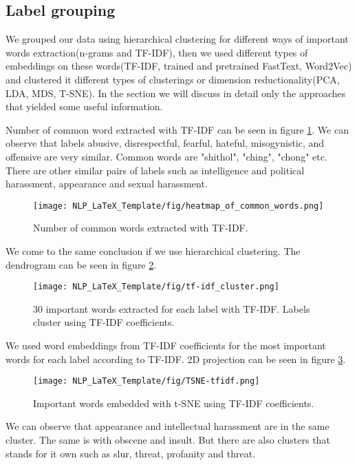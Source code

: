 \documentclass[fleqn,moreauthors,10pt]{ds_report}
\begin{document}
\subsection*{Label grouping}
We grouped our data using hierarchical clustering for different ways of important words extraction(n-grams and TF-IDF), then we used different types of embeddings on these words(TF-IDF, trained and pretrained FastText, Word2Vec) and clustered it different types of clusterings or dimension reductionality(PCA, LDA, MDS, T-SNE). In the section we will discuss in detail only the approaches that yielded some useful information.  

Number of common word extracted with TF-IDF can be seen in figure \ref{fig:common_tfidf}. We can observe that labels abusive, disrespectful, fearful, hateful, misogynistic, and offensive are very similar. Common words are "shithol", "ching", "chong" etc. There are other similar pairs of labels such as intelligence and political harassment, appearance and sexual harassment.
\begin{figure}
    \centering
    \texttt{[image: NLP\_LaTeX\_Template/fig/heatmap\_of\_common\_words.png]}
    \caption{Number of common words extracted with TF-IDF.}
    \label{fig:common_tfidf}
\end{figure}
We come to the same conclusion if we use hierarchical clustering. The dendrogram can be seen in figure \ref{fig:hierarchical_tfidf}.
\begin{figure}
    \centering
    \texttt{[image: NLP\_LaTeX\_Template/fig/tf-idf\_cluster.png]}
    \caption{30 important words extracted for each label with TF-IDF. Labels cluster using TF-IDF coefficients.}
    \label{fig:hierarchical_tfidf}
\end{figure}

We used word embeddings from TF-IDF coefficients for the most important words for each label according to TF-IDF. 2D projection can be seen in figure \ref{fig:tfidf_embedding}.
\begin{figure}
    \centering
    \texttt{[image: NLP\_LaTeX\_Template/fig/TSNE-tfidf.png]}%
    \caption{Important words embedded with t-SNE using TF-IDF coefficients.}
    \label{fig:tfidf_embedding}
\end{figure}
We can observe that appearance and intellectual harassment are in the same cluster. The same is with obscene and insult. But there are also clusters that stands for it own such as slur, threat, profanity and threat.
\end{document}
